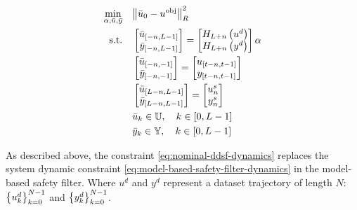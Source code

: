 \begin{subequations}
\label{eq:nominal-ddsf} 
\begin{align}
    \min_{\alpha, \bar{u}, \bar{y}} \quad & \norm{\bar{u}_{0} - u^{\text{obj}}}_R^2  \label{eq:nominal-ddsf-cost}\\
    \textrm{s.t.} \quad & 
    \begin{bmatrix}
        \bar{u}_{\left[ -n, L-1 \right]} \\
        \bar{y}_{\left[ -n, L-1 \right]} \\
    \end{bmatrix} = 
    \begin{bmatrix}
        H_{L+n}\left( u^d \right) \\
        H_{L+n}\left( y^d \right) \\
    \end{bmatrix} \alpha \label{eq:nominal-ddsf-dynamics}\\
    & 
    \begin{bmatrix}
        \bar{u}_{\left[ -n, -1 \right]} \\
        \bar{y}_{\left[ -n, -1 \right]} \\
    \end{bmatrix} = 
    \begin{bmatrix}
        u_{\left[ t-n, t-1 \right]} \\
        y_{\left[ t-n, t-1 \right]} \\
    \end{bmatrix} \label{eq:nominal-ddsf-initial}\\
    & 
    \begin{bmatrix}
        \bar{u}_{\left[ L-n, L-1 \right]} \\
        \bar{y}_{\left[ L-n, L-1 \right]} \\
    \end{bmatrix} = 
    \begin{bmatrix}
        u_n^s \\
        y_n^s \\
    \end{bmatrix} \label{eq:nominal-ddsf-terminal}\\
    &
    \bar{u}_k \in \mathbb{U}, \quad k \in \left[0, L-1\right] \label{eq:nominal-ddsf-input}\\
    &
    \bar{y}_k \in \mathbb{Y}, \quad k \in \left[0, L-1\right] \label{eq:nominal-ddsf-output}
\end{align}
\end{subequations}

As described above, the constraint \cref{eq:nominal-ddsf-dynamics} replaces the system dynamic constraint \cref{eq:model-based-safety-filter-dynamics} in the model-based safety filter.
Where $u^d$ and $y^d$ represent a dataset trajectory of length $N$: $\left\{u^d_k\right\}_{k=0}^{N-1}$ and $\left\{y^d_k\right\}_{k=0}^{N-1}$.

